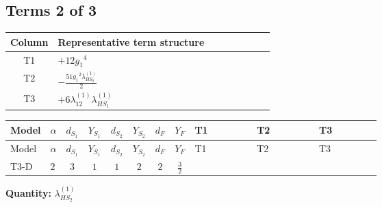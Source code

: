 \documentclass[8pt]{article}
\begin{document}
\begin{landscape}
\subsection*{Terms 2 of 3}
\begin{center}
\begin{tabular}{@{}c >{\raggedright\arraybackslash}p{0.82\linewidth}@{}}
\toprule
Column & Representative term structure \\
\midrule
T1 & \(\displaystyle +12 {g_1}^4\) \\
\midrule
T2 & \(\displaystyle -\frac{51 {g_1}^2 {\lambda_{HS_2}^{(1)}}}{2}\) \\
\midrule
T3 & \(\displaystyle +6 {\lambda_{12}^{(1)}} {\lambda_{HS_1}^{(1)}}\) \\
\midrule
\bottomrule
\end{tabular}
\end{center}
\smallskip
\tiny
\begin{longtable}{@{}llcccccc >{\raggedright\arraybackslash}p{0.21\linewidth} >{\raggedright\arraybackslash}p{0.21\linewidth} >{\raggedright\arraybackslash}p{0.21\linewidth}@{}}
\toprule
Model & $\alpha$ & $d_{S_1}$ & $Y_{S_1}$ & $d_{S_2}$ & $Y_{S_2}$ & $d_F$ & $Y_F$ & T1 & T2 & T3 \\
\midrule
\endfirsthead
\toprule
Model & $\alpha$ & $d_{S_1}$ & $Y_{S_1}$ & $d_{S_2}$ & $Y_{S_2}$ & $d_F$ & $Y_F$ & T1 & T2 & T3 \\
\midrule
\endhead
T3-D & $2$ & $3$ & $1$ & $1$ & $2$ & $2$ & $\frac{3}{2}$ & \scriptsize\adjustbox{max width=\linewidth}{$\begin{gathered} +12 {g_1}^4\end{gathered}$} & \scriptsize\adjustbox{max width=\linewidth}{$\begin{gathered} -\frac{51 {g_1}^2 {\lambda_{HS_2}^{(1)}}}{2}\end{gathered}$} & \scriptsize\adjustbox{max width=\linewidth}{$\begin{gathered} +6 {\lambda_{12}^{(1)}} {\lambda_{HS_1}^{(1)}}\end{gathered}$} \\
\midrule
\bottomrule
\end{longtable}
\clearpage
\noindent\textbf{Quantity: }$\lambda_{HS_2}^{(1)}$\par\smallskip

\end{landscape}
\end{document}
